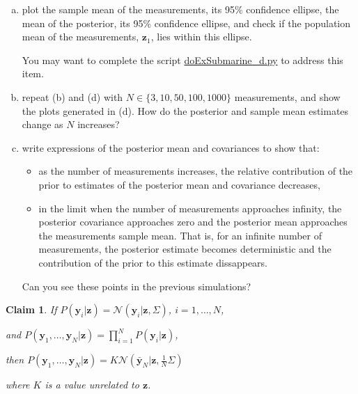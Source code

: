 \documentclass[12pt]{article}
\newtheorem{claim}{Claim}
\begin{document}
\begin{enumerate}[(a)]
\begin{itemize}
        \end{itemize}

    \item plot the sample mean of the measurements, its 95\% confidence
        ellipse, the mean of the posterior, its 95\% confidence ellipse, and
        check if the population mean of the measurements, $\mathbf{z}_1$, lies
        within this ellipse.

        You may want to complete the script
        \href{https://github.com/joacorapela/gcnuBridging2023/blob/master/code/scripts/probability/unsupervisedInferenceInTheLinearGaussianModel/doExSubmarine_d.py}{doExSubmarine\_d.py}
        to address this item.

    \item repeat (b) and (d) with $N\in\{3,10,50,100,1000\}$ measurements, and show
        the plots generated in (d).  How do the posterior and sample mean
        estimates change as $N$ increases?

    \item write expressions of the posterior mean and covariances to show that:

        \begin{itemize}

            \item as the number of measurements increases, the relative
                contribution of the prior to estimates of the posterior
                mean and covariance decreases,

            \item in the limit when the number of measurements approaches
                infinity, the posterior covariance approaches zero and the
                posterior mean approaches the measurements sample mean.
                That is, for an infinite number of measurements, the
                posterior estimate becomes deterministic and the
                contribution of the prior to this estimate dissappears.

        \end{itemize}

        Can you see these points in the previous simulations?

\end{enumerate}

\pagebreak

\begin{claim}
    If
    $P(\mathbf{y}_i|\mathbf{z})=\mathcal{N}\left(\mathbf{y}_i|\mathbf{z},\Sigma\right)$,
    $i=1,\ldots,N$, 

    and
    $P(\mathbf{y}_1,\ldots,\mathbf{y}_N|\mathbf{z})=\prod_{i=1}^N
    P(\mathbf{y}_i|\mathbf{z})$, 

    then
    $P(\mathbf{y}_1,\ldots,\mathbf{y}_N|\mathbf{z})=K\mathcal{N}(\bar{\mathbf{y}}_N|\mathbf{z},\frac{1}{N}\Sigma)$

    where $K$ is a value unrelated to $\mathbf{z}$.
    \label{claim:likelihoodForZ}
\end{claim}
\end{document}
